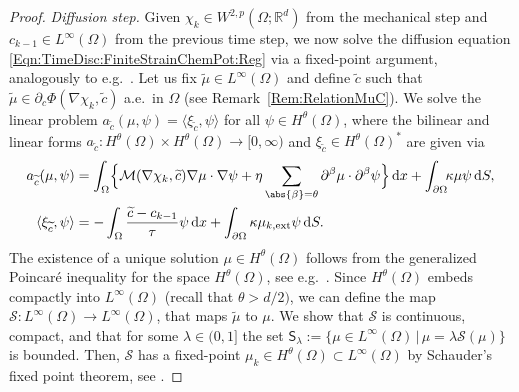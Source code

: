 \documentclass[a4paper,12pt]{article}
\newcommand{\ext}{\mathrm{ext}}
\newcommand{\R}{\mathbb{R}}
\newcommand{\calM}{\mathcal{M}}
\newcommand{\pl}{\partial}
\newcommand{\wt}{\widetilde}
\newcommand{\dx}{\mathrm{\,d}x}
\newcommand{\dd}{\mathrm{\,d}}
\newcommand{\dS}{\mathrm{\,d}S}
\theoremstyle{plain}
\theoremstyle{definition}
\numberwithin{equation}{section}
\begin{document}
\begin{proof}
\textit{Diffusion step. } Given $\chi_k\in W^{2,p}(\Omega;\R^d)$ from the mechanical step and $c_{k-1}\in L^\infty(\Omega)$ from the previous time step, 
we now solve the diffusion equation \eqref{Eqn:TimeDisc:FiniteStrainChemPot:Reg} via a fixed-point argument, analogously to e.g.\ \cite{Jung2015BbEMfCDS, FHKM2022GEAE}. Let us fix $\wt\mu\in L^\infty(\Omega)$
and define $\widetilde c$ such that $\widetilde{\mu}\in \pl_c\Phi(\nabla\chi_k,\widetilde c)$ a.e.\ in $\Omega$ (see Remark~\ref{Rem:RelationMuC}). 
We solve the linear problem $a_{\widetilde{c}}(\mu,\psi)
= \langle\xi_{\widetilde{c}},\psi\rangle$ for all $\psi\in H^\theta(\Omega)$, 
where the bilinear and linear forms $a_{\widetilde{c}}:H^\theta(\Omega)\times H^\theta(\Omega)\to[0,\infty)$ and $\xi_{\widetilde{c}}\in H^\theta(\Omega)^*$
are given via
\begin{align*}
a_{\widetilde{c}}(\mu,\psi)&=\int_\Omega\!\Big\{  \calM(\nabla\chi_{k},\widetilde c)\nabla\mu \cdot \nabla\psi  + \eta\sum_{\abs{\beta}=\theta}\pl^\beta\mu\cdot \pl^\beta\psi \Big\}\dx + \int_{\pl\Omega}\!\!\kappa\mu\psi\dS,\\
\langle\xi_{\widetilde{c}},\psi\rangle &= -\int_{\Omega}\frac{\widetilde{c}-c_{k-1}}{\tau}\psi\dd x + \int_{\pl\Omega}\kappa\mu_{k,\ext}\psi\dd S.
\end{align*}
The existence of a unique solution $\mu\in H^\theta(\Omega)$
follows from the generalized Poincar\'e inequality for
the space $H^\theta(\Omega)$, see e.g.\ \cite[Ch.\ 2.1.4]{Tema1997IDDS}. Since $H^\theta(\Omega)$ embeds compactly
into $L^\infty(\Omega)$ (recall that $\theta> d/2)$, we can define
the map $\mathcal{S}: L^\infty(\Omega)\to L^\infty(\Omega)$, 
that maps $\widetilde\mu$ to $\mu$. We show that 
$\mathcal{S}$ is continuous, compact, and that for some $\lambda\in(0,1]$ the set 
$\mathsf{S}_\lambda:=\{\mu\in L^\infty(\Omega)\,|\, \mu = \lambda \mathcal{S}(\mu) \}$ is bounded.
Then, $\mathcal{S}$ has a fixed-point $\mu_k\in H^\theta(\Omega)\subset L^\infty(\Omega)$ by Schauder's fixed point theorem, see \cite[Thm.\ 11.3]{GilTru2001EPDE}.


\end{proof}
\end{document}
